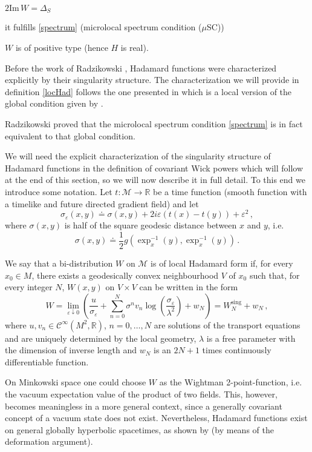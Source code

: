 \documentclass[11pt]{article}
\newcommand{\Mcal}{\mathcal{M}}
\newcommand{\Ci}{\mathcal{C}^\infty} %
\newcommand{\RR}{\mathbb{R}}           %
\newcommand{\la}{\lambda}
\newcommand{\sst}[1]{\scriptscriptstyle{#1}}  %
\newcommand{\minus}{\sst{-1}}   %
\newcommand{\1}{\mathds{1}}                         %
\newcommand{\be}{\begin{equation}}
\newcommand{\ee}{\end{equation}}
\begin{document}
{\begin{df}
\begin{enumerate}
{\item \label{im} $2\mathrm{Im}\,W=\Delta_S$}

{\item it fulfills \eqref{spectrum} (microlocal spectrum condition ($\mu$SC))}

{\item \label{pos} $W$ is of positive type (hence $H$ is real).}
\end{enumerate}
\end{df}
Before the work of Radzikowski \cite{Rad}, Hadamard functions were characterized explicitly by their singularity structure. The characterization we will provide in definition \ref{locHad} follows the one presented in \cite{Hack} which is a local version of the global condition given by \cite{KW91}. {Radzikowski proved that the microlocal spectrum condition  \eqref{spectrum} is in fact equivalent to that global condition. 

We will need the explicit characterization of the singularity structure of Hadamard functions in the definition of covariant Wick powers which will follow at the end of this section, so we will now describe it in full detail. To this end we introduce some notation. Let $t:\Mcal\rightarrow\RR$ be a time function (smooth function with a timelike and future directed gradient field) and let
\[
\sigma_\varepsilon(x,y)\doteq \sigma(x,y)+2i\varepsilon(t(x)-t(y))+\varepsilon^2\,,
\]
where $\sigma(x,y)$ is half of the square geodesic distance between $x$ and $y$, i.e. 
\[
\sigma(x,y)\doteq \frac{1}{2}g(\exp_x^{\minus}(y),\exp_x^{\minus}(y))\,.
\]
\begin{df}\label{locHad}
We say that a bi-distribution $W$ on $\Mcal$ is of local Hadamard form if, for every $x_0\in M$, there exists a geodesically convex neighbourhood $V$ of $x_0$ such that, for every integer $N$, $W(x,y)$ on $V\times V$ can be written in the form
\be\label{Hadform}
W=\lim_{\varepsilon\downarrow0}\left(\frac{u}{\sigma_\varepsilon}+\sum_{n=0}^N\sigma^nv_n\log\left(\frac{\sigma_\varepsilon}{\la^2}\right)+w_N\right)=W_{N}^{\textrm{sing}}+w_N\,,
\ee
where $u, v_n \in\Ci(M^2,\RR)$, $n=0,\ldots,N$ are solutions of the transport equations and are uniquely determined by the local geometry, $\la$ is a free parameter with the dimension of inverse length and $w_N$ is an $2N + 1$ times continuously
differentiable function.
\end{df}

 On Minkowski space one could choose $W$ as the  Wightman 2-point-function, i.e. the vacuum expectation value of the product of two fields. This, however, becomes meaningless in a more general context, since a generally covariant concept of a vacuum state does not exist. Nevertheless, Hadamard functions exist on general globally hyperbolic spacetimes, as shown by \cite{FNW} (by means of the deformation argument).
 
}}
\end{document}
